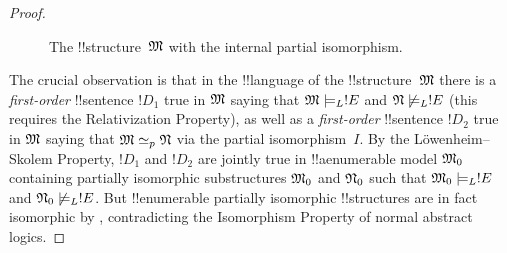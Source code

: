 \documentclass[../../../include/open-logic-section]{subfiles}
\begin{document}
\begin{proof}
\begin{figure}[h]
  \centering
  \caption{The !!{structure}~$\Struct{M}$ with the internal
    partial isomorphism.}
\end{figure}

The crucial observation is that in the !!{language} of the
!!{structure}~$\Struct{M}$ there is a \emph{first-order} !!{sentence} $!D_1$
true in $\Struct{M}$ saying that $\Struct{M} \models_L !E$ and
$\Struct{N} \not\models_L !E$ (this requires the Relativization
Property), as well as a \emph{first-order} !!{sentence} $!D_2$ true in
$\Struct{M}$ saying that $\Struct{M} \simeq_p \Struct{N}$ via the
partial isomorphism~$I$. By the L\"owenheim--Skolem Property, $!D_1$
and $!D_2$ are jointly true in !!a{enumerable} model $\Struct{M}_0$
containing partially isomorphic substructures $\Struct{M}_0$ and
$\Struct{N}_0$ such that $\Struct{M}_0 \models_L !E$ and $\Struct{N}_0
\not\models_L !E$. But !!{enumerable} partially isomorphic !!{structure}s are
in fact isomorphic by , contradicting the
Isomorphism Property of normal abstract logics.
\end{proof}
\end{document}
